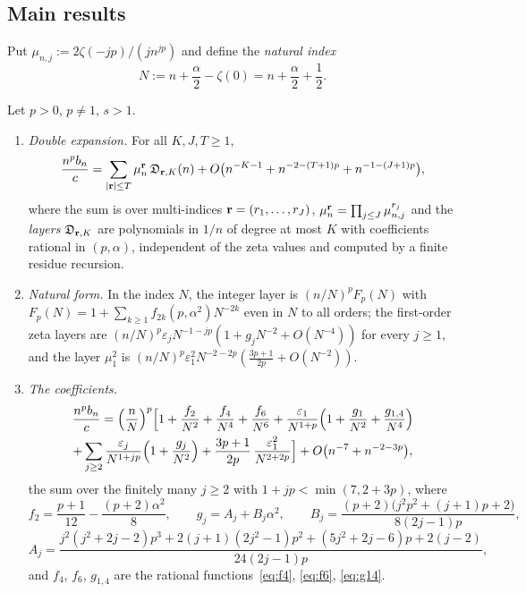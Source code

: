 \subsection{Main results}\label{sec:results}
Put $\mu_{n,j}:=2\zeta(-jp)/(jn^{jp})$ and define the \emph{natural index}
\begin{equation}\label{eq:N}
  N:=n+\frac\alpha2-\zeta(0)=n+\frac\alpha2+\frac12 .
\end{equation}

\begin{mainthm}\label{thm:A}
Let $p>0$, $p\ne1$, $s>1$.
\begin{enumerate}
\item[(i)] \emph{Double expansion.} For all $K,J,T\ge1$,
\[
  \frac{n^pb_n}c=\sum_{|\mathbf r|\le T}\mu_n^{\mathbf r}\,\mathfrak D_{\mathbf r,K}(n)+O\bigl(n^{-K-1}+n^{-2-(T+1)p}+n^{-1-(J+1)p}\bigr),
\]
where the sum is over multi-indices $\mathbf r=(r_1,\dots,r_J)$, $\mu_n^{\mathbf r}=\prod_{j\le J}\mu_{n,j}^{r_j}$ and the \emph{layers} $\mathfrak D_{\mathbf r,K}$ are polynomials in $1/n$ of degree at most $K$ with
coefficients rational in $(p,\alpha)$, independent of the zeta values and computed by a finite residue recursion.
\item[(ii)] \emph{Natural form.} In the index $N$, the integer layer is $(n/N)^pF_p(N)$ with
$F_p(N)=1+\sum_{k\ge1}f_{2k}(p,\alpha^2)N^{-2k}$ even in $N$ to all orders; the first-order zeta layers are
$(n/N)^p\varepsilon_jN^{-1-jp}(1+g_jN^{-2}+O(N^{-4}))$ for every $j\ge1$, and the layer $\mu_1^2$ is
$(n/N)^p\varepsilon_1^2N^{-2-2p}(\frac{3p+1}{2p}+O(N^{-2}))$.
\item[(iii)] \emph{The coefficients.}
\begin{multline}\label{eq:thmA}
  \frac{n^pb_n}{c}=\Bigl(\frac nN\Bigr)^p\Bigl[1+\frac{f_2}{N^2}+\frac{f_4}{N^4}+\frac{f_6}{N^6}
  +\frac{\varepsilon_1}{N^{1+p}}\Bigl(1+\frac{g_1}{N^2}+\frac{g_{1,4}}{N^4}\Bigr)\\
  +\sum_{j\ge2}\frac{\varepsilon_j}{N^{1+jp}}\Bigl(1+\frac{g_j}{N^2}\Bigr)
  +\frac{3p+1}{2p}\,\frac{\varepsilon_1^2}{N^{2+2p}}\Bigr]
  +O\bigl(n^{-7}+n^{-2-3p}\bigr),
\end{multline}
the sum over the finitely many $j\ge2$ with $1+jp<\min(7,2+3p)$, where
\[
  f_2=\frac{p+1}{12}-\frac{(p+2)\alpha^2}{8},\qquad g_j=A_j+B_j\alpha^2,\qquad
  B_j=\frac{(p+2)\bigl(j^2p^2+(j+1)p+2\bigr)}{8(2j-1)p},
\]
\[
  A_j=\frac{j^2(j^2+2j-2)p^3+2(j+1)(2j^2-1)p^2+(5j^2+2j-6)p+2(j-2)}{24(2j-1)p},
\]
and $f_4$, $f_6$, $g_{1,4}$ are the rational functions~\eqref{eq:f4}, \eqref{eq:f6}, \eqref{eq:g14}.
\end{enumerate}
\end{mainthm}

